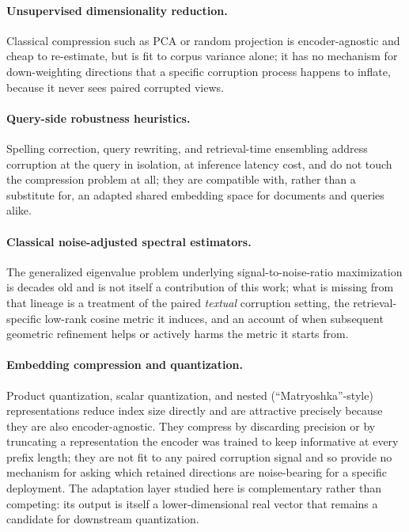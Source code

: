 \paragraph{Unsupervised dimensionality reduction.} Classical compression
such as PCA or random projection is encoder-agnostic and cheap to
re-estimate, but is fit to corpus variance alone; it has no mechanism for
down-weighting directions that a specific corruption process happens to
inflate, because it never sees paired corrupted views.

\paragraph{Query-side robustness heuristics.} Spelling correction,
query rewriting, and retrieval-time ensembling address corruption at the
query in isolation, at inference latency cost, and do not touch the
compression problem at all; they are compatible with, rather than a
substitute for, an adapted shared embedding space for documents and
queries alike.

\paragraph{Classical noise-adjusted spectral estimators.} The generalized
eigenvalue problem underlying signal-to-noise-ratio maximization is decades
old and is not itself a contribution of this work; what is missing from
that lineage is a treatment of the paired \emph{textual} corruption setting,
the retrieval-specific low-rank cosine metric it induces, and an account
of when subsequent geometric refinement helps or actively harms the
metric it starts from.

\paragraph{Embedding compression and quantization.} Product quantization,
scalar quantization, and nested (``Matryoshka''-style) representations
reduce index size directly and are attractive precisely because they are
also encoder-agnostic. They compress by discarding precision or by
truncating a representation the encoder was trained to keep informative at
every prefix length; they are not fit to any paired corruption signal and
so provide no mechanism for asking which retained directions are
noise-bearing for a specific deployment. The adaptation layer studied here
is complementary rather than competing: its output is itself a
lower-dimensional real vector that remains a candidate for downstream
quantization.

